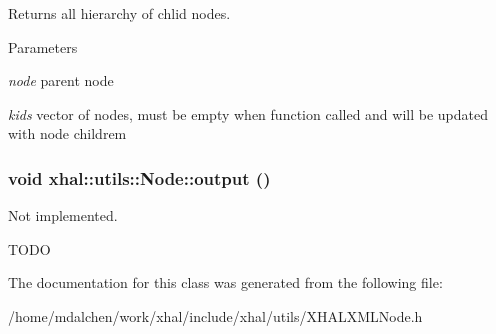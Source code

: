 Returns all hierarchy of chlid nodes. 
\begin{DoxyParams}{Parameters}
\item[{\em node}]parent node \item[{\em kids}]vector of nodes, must be empty when function called and will be updated with node childrem \end{DoxyParams}
\hypertarget{classxhal_1_1utils_1_1Node_a2ef158a6071fd2d560ebd09e606cd7b0}{
\subsubsection[{output}]{\setlength{\rightskip}{0pt plus 5cm}void xhal::utils::Node::output ()}}
\label{classxhal_1_1utils_1_1Node_a2ef158a6071fd2d560ebd09e606cd7b0}


Not implemented. 

TODO 

The documentation for this class was generated from the following file:\begin{DoxyCompactItemize}
\item 
/home/mdalchen/work/xhal/include/xhal/utils/XHALXMLNode.h\end{DoxyCompactItemize}
